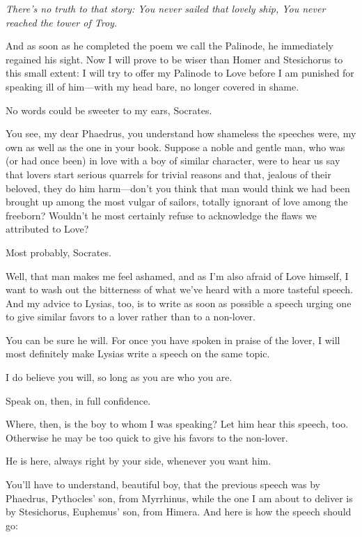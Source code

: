 \startpoem
{\em There’s no truth to that story:
You never sailed that lovely ship,
You never reached the tower of Troy.}
\stoppoem

And as soon as he completed the poem we call the Palinode, he
immediately regained his sight. Now I will prove to be wiser than Homer
and Stesichorus to this small extent: I will try to offer my Palinode to
Love before I am punished for speaking ill of him---with my head bare,
no longer covered in shame.

\sayphaedrus No words could be sweeter to my ears, Socrates.

\saysocrates You see, my dear Phaedrus, you understand how
shameless the speeches were, my own as well as the one in your book.
Suppose a noble and gentle man, who was (or had once been) in love with
a boy of similar character, were to hear us say that lovers start
serious quarrels for trivial reasons and that, jealous of their beloved,
they do him harm---don’t you think that man would think we had been
brought up among the most vulgar of sailors, totally ignorant of
love among the freeborn? Wouldn’t he most certainly refuse to
acknowledge the flaws we attributed to Love?

\sayphaedrus Most probably, Socrates.

\saysocrates Well, that man makes me feel ashamed, and as I’m also afraid
of Love himself, I want to wash out the bitterness of what we’ve heard
with a more tasteful speech. And my advice to Lysias, too, is to write
as soon as possible a speech urging one to give similar favors to a
lover rather than to a non-lover.

\sayphaedrus You can be sure he will. For once you have spoken in praise 
of the lover, I will most definitely make Lysias write a speech
on the same topic.

\saysocrates I do believe you will, so long as you are who you are.

\sayphaedrus Speak on, then, in full confidence.

\saysocrates Where, then, is the boy to whom I was speaking? Let him hear
this speech, too. Otherwise he may be too quick to give his favors to
the non-lover.

\sayphaedrus He is here, always right by your side, whenever you want him.

\saysocrates You’ll have to understand, beautiful boy, that
the previous speech was by Phaedrus, Pythocles’ son, from Myrrhinus,
while the one I am about to deliver is by Stesichorus, Euphemus’ son,
from Himera. And here
is how the speech should go:

